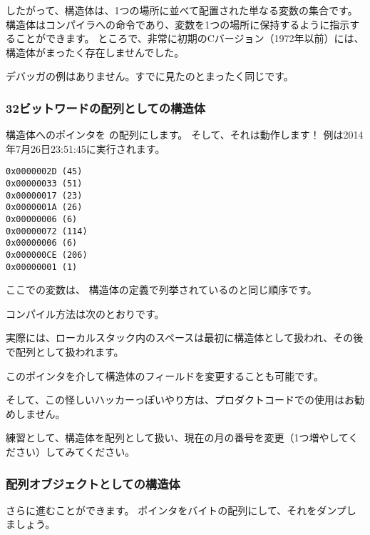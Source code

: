 したがって、構造体は、1つの場所に並べて配置された単なる変数の集合です。 
構造体はコンパイラへの命令であり、変数を1つの場所に保持するように指示することができます。 
ところで、非常に初期のCバージョン（1972年以前）には、構造体がまったく存在しませんでした。 \RitchieDevC

デバッガの例はありません。すでに見たのとまったく同じです。

\subsubsection{32ビットワードの配列としての構造体}



構造体へのポインタを \Tint{} の配列にします。 
そして、それは動作します！ 
例は2014年7月26日23:51:45に実行されます。

\begin{lstlisting}[label=GCC_tm3_output]
0x0000002D (45)
0x00000033 (51)
0x00000017 (23)
0x0000001A (26)
0x00000006 (6)
0x00000072 (114)
0x00000006 (6)
0x000000CE (206)
0x00000001 (1)
\end{lstlisting}

ここでの変数は、
 構造体の定義で列挙されているのと同じ順序です。

コンパイル方法は次のとおりです。



実際には、ローカルスタック内のスペースは最初に構造体として扱われ、その後で配列として扱われます。

このポインタを介して構造体のフィールドを変更することも可能です。

そして、この怪しいハッカーっぽいやり方は、プロダクトコードでの使用はお勧めしません。

\mysubparagraph{\Exercise}

練習として、構造体を配列として扱い、現在の月の番号を変更（1つ増やしてください）してみてください。

\subsubsection{配列オブジェクトとしての構造体}

さらに進むことができます。 ポインタをバイトの配列にして、それをダンプしましょう。

